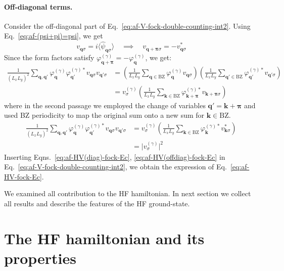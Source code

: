 \begin{tabproof}
	\paragraph{Off-diagonal terms.}
	
	Consider the off-diagonal part of Eq.~\eqref{eq:af-V-fock-double-counting-int2}. Using Eq.~\eqref{eq:af-(psi+pi)=psi}, we get
	\[
		v_{\mathbf{q}\sigma} = i\langle
		\hat \psi_{\mathbf{q}\sigma}
		\rangle
		\quad\implies\quad
		v_{\mathbf{q}+\bm{\pi}\sigma} = - v_{\mathbf{q}\sigma}^*
	\]
	Since the form factors satisfy $\varphi_{\mathbf{q}+\bm{\pi}}^{(\gamma)} = -\varphi_{\mathbf{q}}^{(\gamma)}$, we get:
	\[
	\begin{aligned}
		\frac{1}{(L_x L_y)^2} \sum_{\mathbf{q}, \mathbf{q}'} \varphi_{\mathbf{q}}^{(\gamma)} \varphi_{\mathbf{q}'}^{(\gamma)*}
		v_{\mathbf{q}\sigma} v_{\mathbf{q}'\sigma} &=
		\left(
		\frac{1}{L_x L_y} \sum_{\mathbf{q}\in\mathrm{BZ}} \varphi_{\mathbf{q}}^{(\gamma)} v_{\mathbf{q}\sigma}
		\right) \left(
		\frac{1}{L_x L_y} \sum_{\mathbf{q}'\in\mathrm{BZ}} \varphi_{\mathbf{q}'}^{(\gamma)*} v_{\mathbf{q}'\sigma}
		\right) \\
		&= v^{(\gamma)}_\sigma \left(
		\frac{1}{L_x L_y} \sum_{\mathbf{k}\in\mathrm{BZ}} \varphi_{\mathbf{k}+\bm{\pi}}^{(\gamma)*} v_{\mathbf{k}+\bm{\pi}\sigma}
		\right)
	\end{aligned}
	\]
	where in the second passage we employed the change of variables $\mathbf{q}'=\mathbf{k}+\bm{\pi}$ and used BZ periodicity to map the original sum onto a new sum for $\mathbf{k}\in\mathrm{BZ}$. 	
	\begin{align}
		\frac{1}{(L_x L_y)^2} \sum_{\mathbf{q}, \mathbf{q}'} \varphi_{\mathbf{q}}^{(\gamma)} \varphi_{\mathbf{q}'}^{(\gamma)*}
		v_{\mathbf{q}\sigma} v_{\mathbf{q}'\sigma} &= v^{(\gamma)}_\sigma \left(
		\frac{1}{L_x L_y} \sum_{\mathbf{k}\in\mathrm{BZ}} \varphi_{\mathbf{k}}^{(\gamma)*} v_{\mathbf{k}\sigma}^*
		\right) \nonumber \\
		&= \big| v^{(\gamma)}_\sigma \big|^2 \label{eq:af-HV(offdiag)-fock-Ec}
	\end{align}
	Inserting Eqns.~\eqref{eq:af-HV(diag)-fock-Ec}, \eqref{eq:af-HV(offdiag)-fock-Ec} in Eq.~\eqref{eq:af-V-fock-double-counting-int2}, we obtain the expression of Eq.~\eqref{eq:af-HV-fock-Ec}.
\end{tabproof}
%
We examined all contribution to the HF hamiltonian. In next section we collect all results and describe the features of the HF ground-state.

\section{The HF hamiltonian and its properties}\label{sec:af-hf-hamiltonian}

